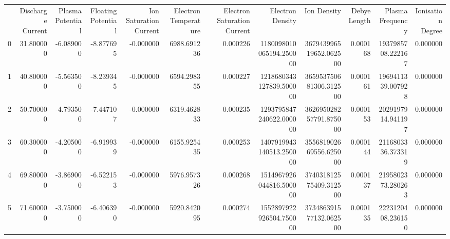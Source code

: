 \begin{tabular}{lrrrrrrrrrrr}
 & Discharge Current & Plasma Potential & Floating Potential & Ion Saturation Current & Electron Temperature & Electron Saturation Current & Electron Density & Ion Density & Debye Length & Plasma Frequency & Ionisation Degree \\
0 & 31.800000 & -6.089000 & -8.877695 & -0.000000 & 6988.691236 & 0.000226 & 1180098010065194.250000 & 367943996519652.062500 & 0.000168 & 1937985708.222167 & 0.000000 \\
1 & 40.800000 & -5.563500 & -8.239345 & -0.000000 & 6594.298355 & 0.000227 & 1218680343127839.500000 & 365953750681306.312500 & 0.000161 & 1969411339.007928 & 0.000000 \\
2 & 50.700000 & -4.793500 & -7.447107 & -0.000000 & 6319.462833 & 0.000235 & 1293795847240622.000000 & 362695028257791.875000 & 0.000153 & 2029197914.941197 & 0.000000 \\
3 & 60.300000 & -4.205000 & -6.919939 & -0.000000 & 6155.925435 & 0.000253 & 1407919943140513.250000 & 355681902669556.625000 & 0.000144 & 2116803336.373319 & 0.000000 \\
4 & 69.800000 & -3.869000 & -6.522153 & -0.000000 & 5976.957326 & 0.000268 & 1514967926044816.500000 & 374031812575409.312500 & 0.000137 & 2195802373.280263 & 0.000000 \\
5 & 71.600000 & -3.750000 & -6.406390 & -0.000000 & 5920.842095 & 0.000274 & 1552897922926504.750000 & 373486391577132.062500 & 0.000135 & 2223120408.236150 & 0.000000 \\
\end{tabular}
